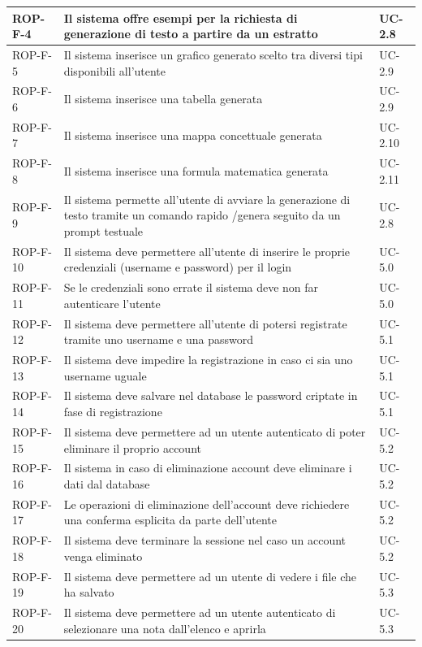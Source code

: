 \documentclass[11pt,a4paper]{article}
\begin{document}
\begin{longtable}{|p{}|>{\raggedright\arraybackslash}p{}|p{}|}
\hline
ROP-F-4 & Il sistema offre esempi per la richiesta di generazione di testo a partire da un estratto & UC-2.8 \\
\hline
ROP-F-5 & Il sistema inserisce un grafico generato scelto tra diversi tipi disponibili all'utente & UC-2.9 \\
\hline
ROP-F-6 & Il sistema inserisce una tabella generata & UC-2.9 \\
\hline
ROP-F-7 & Il sistema inserisce una mappa concettuale generata & UC-2.10 \\
\hline
ROP-F-8 & Il sistema inserisce una formula matematica generata & UC-2.11 \\
\hline
ROP-F-9 & Il sistema permette all'utente di avviare la generazione di testo tramite un comando rapido /genera seguito da un prompt testuale & UC-2.8 \\
\hline
ROP-F-10 & Il sistema deve permettere all'utente di inserire le proprie credenziali (username e password) per il login & UC-5.0 \\
\hline
ROP-F-11 & Se le credenziali sono errate il sistema deve non far autenticare l'utente & UC-5.0 \\
\hline
ROP-F-12 & Il sistema deve permettere all'utente di potersi registrate tramite uno username e una password & UC-5.1 \\
\hline
ROP-F-13 & Il sistema deve impedire la registrazione in caso ci sia uno username uguale & UC-5.1 \\
\hline
ROP-F-14 & Il sistema deve salvare nel database le password criptate in fase di registrazione & UC-5.1 \\
\hline
ROP-F-15 & Il sistema deve permettere ad un utente autenticato di poter eliminare il proprio account & UC-5.2 \\
\hline
ROP-F-16 & Il sistema in caso di eliminazione account deve eliminare i dati dal database & UC-5.2 \\
\hline
ROP-F-17 & Le operazioni di eliminazione dell'account deve richiedere una conferma esplicita da parte dell'utente & UC-5.2 \\
\hline
ROP-F-18 & Il sistema deve terminare la sessione nel caso un account venga eliminato & UC-5.2 \\
\hline
ROP-F-19 & Il sistema deve permettere ad un utente di vedere i file che ha salvato & UC-5.3 \\
\hline
ROP-F-20 & Il sistema deve permettere ad un utente autenticato di selezionare una nota dall'elenco e aprirla & UC-5.3 \\
\hline

\end{longtable}
\end{document}
